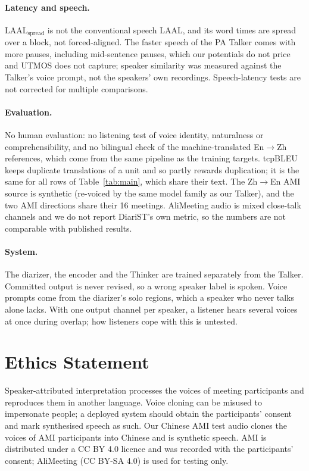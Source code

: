 \paragraph{Latency and speech.} LAAL$_\text{spread}$ is not the conventional speech LAAL, and its word times are spread
over a block, not forced-aligned. The faster speech of the PA Talker comes with more pauses, including mid-sentence
pauses, which our potentials do not price and UTMOS does not capture; speaker similarity was measured against the
Talker's voice prompt, not the speakers' own recordings. Speech-latency tests are not corrected for multiple
comparisons.

\paragraph{Evaluation.} No human evaluation: no listening test of voice identity, naturalness or comprehensibility,
and no bilingual check of the machine-translated En$\rightarrow$Zh references, which come from the same pipeline as the
training targets. tcpBLEU keeps duplicate translations of a unit and so partly rewards duplication; it is the same for
all rows of Table~\ref{tab:main}, which share their text. The Zh$\rightarrow$En AMI source is synthetic (re-voiced by
the same model family as our Talker), and the two AMI directions share their 16 meetings. AliMeeting audio is mixed
close-talk channels and we do not report DiariST's own metric, so the numbers are not comparable with published
results.

\paragraph{System.} The diarizer, the encoder and the Thinker are trained separately from the Talker. Committed output
is never revised, so a wrong speaker label is spoken. Voice prompts come from the diarizer's solo regions, which a
speaker who never talks alone lacks. With one output channel per speaker, a listener hears several voices at once
during overlap; how listeners cope with this is untested.

\section*{Ethics Statement}

Speaker-attributed interpretation processes the voices of meeting participants and reproduces them in another
language. Voice cloning can be misused to impersonate people; a deployed system should obtain the participants'
consent and mark synthesised speech as such. Our Chinese AMI test audio clones the voices of AMI participants into
Chinese and is synthetic speech. AMI is distributed under a CC BY 4.0 licence and was recorded with the participants'
consent; AliMeeting (CC BY-SA 4.0) is used for testing only.
